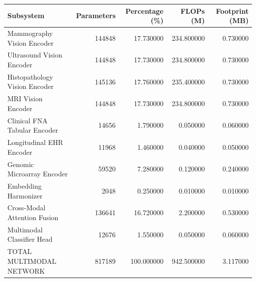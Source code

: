 \begin{tabular}{lrrrr}
\toprule
Subsystem & Parameters & Percentage (\%) & FLOPs (M) & Footprint (MB) \\
\midrule
Mammography Vision Encoder & 144848 & 17.730000 & 234.800000 & 0.730000 \\
Ultrasound Vision Encoder & 144848 & 17.730000 & 234.800000 & 0.730000 \\
Histopathology Vision Encoder & 145136 & 17.760000 & 235.400000 & 0.730000 \\
MRI Vision Encoder & 144848 & 17.730000 & 234.800000 & 0.730000 \\
Clinical FNA Tabular Encoder & 14656 & 1.790000 & 0.050000 & 0.060000 \\
Longitudinal EHR Encoder & 11968 & 1.460000 & 0.040000 & 0.050000 \\
Genomic Microarray Encoder & 59520 & 7.280000 & 0.120000 & 0.240000 \\
Embedding Harmonizer & 2048 & 0.250000 & 0.010000 & 0.010000 \\
Cross-Modal Attention Fusion & 136641 & 16.720000 & 2.200000 & 0.530000 \\
Multimodal Classifier Head & 12676 & 1.550000 & 0.050000 & 0.060000 \\
TOTAL MULTIMODAL NETWORK & 817189 & 100.000000 & 942.500000 & 3.117000 \\
\bottomrule
\end{tabular}
